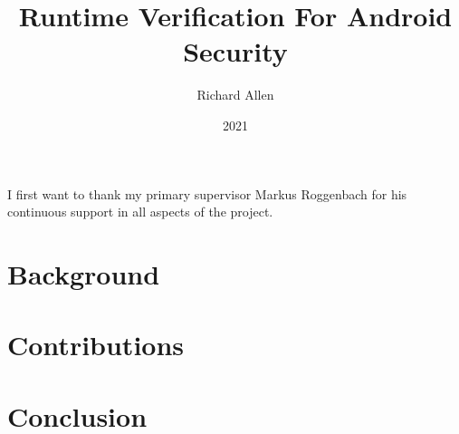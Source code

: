 \documentclass[11pt, a4paper, twoside]{custard}
\title{Runtime Verification For Android Security}
\author{Richard Allen}
\date{2021}
\begin{document}
\frontmatter %

\maketitle
\declaration



\begin{Acknowledgements}
I first want to thank my primary supervisor Markus Roggenbach for his continuous support in all aspects of the project.
\end{Acknowledgements} 


\tableofcontents*

\restoregeometry

\mainmatter %



\part{Background}








\part{Contributions}






\part{Conclusion}






\appendix
{}








\restoregeometry
\end{document}
